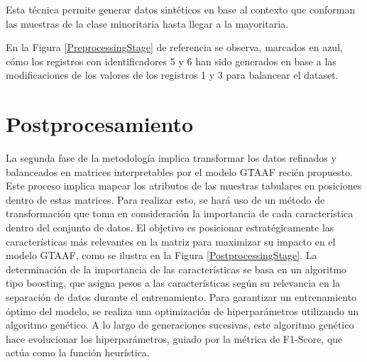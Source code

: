 \documentclass{uathesis-es}
\begin{document}
Esta técnica permite generar datos sintéticos en base al contexto que conforman las muestras de la clase minoritaria hasta llegar a la mayoritaria.

En la Figura \ref{PreprocessingStage} de referencia se observa, marcados en azul, cómo los registros con identificadores 5 y 6 han sido generados en base a las modificaciones de los valores de los registros 1 y 3 para balancear el dataset.


\section{Postprocesamiento}

La segunda fase de la metodología implica transformar los datos refinados y balanceados en matrices interpretables por el modelo GTAAF recién propuesto. Este proceso implica mapear los atributos de las muestras tabulares en posiciones dentro de estas matrices. Para realizar esto, se hará uso de un método de transformación que toma en consideración la importancia de cada característica dentro del conjunto de datos. El objetivo es posicionar estratégicamente las características más relevantes en la matriz para maximizar su impacto en el modelo GTAAF, como se ilustra en la Figura \ref{PostprocessingStage}. La determinación de la importancia de las características se basa en un algoritmo tipo boosting, que asigna pesos a las características según su relevancia en la separación de datos durante el entrenamiento. Para garantizar un entrenamiento óptimo del modelo, se realiza una optimización de hiperparámetros utilizando un algoritmo genético. A lo largo de generaciones sucesivas, este algoritmo genético hace evolucionar los hiperparámetros, guiado por la métrica de F1-Score, que actúa como la función heurística.
\end{document}
